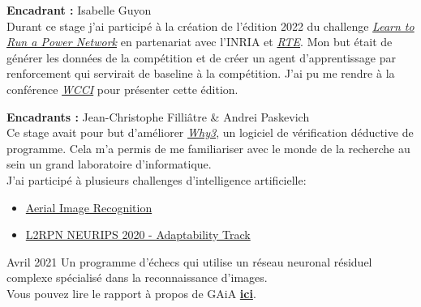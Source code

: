 \documentclass[10pt,a4paper,ragged2e,withhyper]{altacv}
\begin{document}
\begin{paracol}{2}

        \textbf{Encadrant :} Isabelle Guyon\\
        \vspace{3pt}
        Durant ce stage j'ai participé à la création de l'édition 2022 du challenge
        \href{https://l2rpn.chalearn.org/}{\textit{Learn to Run a Power Network}} en partenariat avec l'INRIA et
        \href{https://www.rte-france.com/}{\textit{RTE}}.
        Mon but était de générer les données de la compétition et de créer un agent d'apprentissage par renforcement
        qui servirait de baseline à la compétition. J'ai pu me rendre à la conférence
        \href{https://wcci2022.org/}{\textit{WCCI}} pour présenter cette édition.
        
        \divider

        \textbf{Encadrants :} Jean-Christophe Filliâtre \& Andrei Paskevich\\
        \vspace{3pt}
        Ce stage avait pour but d'améliorer \href{http://why3.lri.fr/}{\textit{Why3}}, un logiciel de vérification déductive de programme.
        Cela m'a permis de me familiariser avec le monde de la recherche au sein un grand laboratoire d'informatique.\\

        \pagebreak
          J'ai participé à plusieurs challenges d'intelligence artificielle:
          \begin{itemize}
            \item \href{https://codalab.lisn.upsaclay.fr/competitions/573}{Aerial Image Recognition}
            \item \href{https://competitions.codalab.org/competitions/25427}{L2RPN NEURIPS 2020 - Adaptability Track}
          \end{itemize}

            {Avril 2021}{}
            Un programme d'échecs qui utilise un réseau neuronal résiduel complexe spécialisé dans la reconnaissance d'images.\\
            Vous pouvez lire le rapport à propos de GAiA
            \href{https://raw.githubusercontent.com/gaetanserre/GAiA/master/report/Performing%20Regression%20on%20Complex%20Data.pdf}
            {\textbf{ici}}.\\
            \vspace{4pt}
            \\
            \vspace{4pt}
            \divider


\end{paracol}
\end{document}
